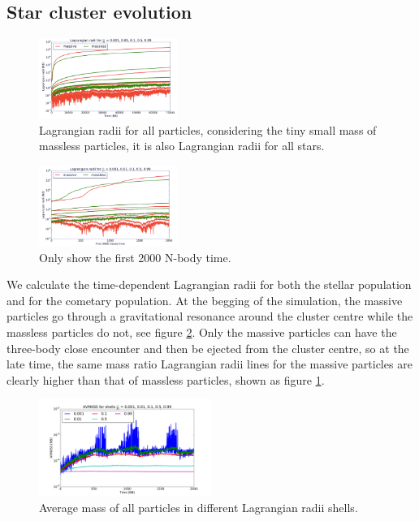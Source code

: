 \documentclass[usenatbib]{mnras}
\newcommand{\nna}{N_{\rm 1}}
\newcommand{\nnc}{N_{\rm 3}}
\begin{document}
\subsection{Star cluster evolution}

\begin{figure}
  \centering
  \includegraphics[width=0.4\textwidth,height=!]{lagrComparing.pdf}
  \caption{Lagrangian radii for all particles, considering the tiny small mass of massless particles, it is also Lagrangian radii for all stars.}
  \label{fig:lagrComparing}
\end{figure}


\begin{figure}
  \centering
  \includegraphics[width=0.4\textwidth,height=!]{lagr2000st.pdf}
  \caption{Only show the first 2000 N-body time.}
  \label{fig:lagr2000st}
\end{figure}

We calculate the time-dependent Lagrangian radii for both the stellar population and for the cometary population. At the begging of the simulation, the massive particles go through a gravitational resonance around the cluster centre while the massless particles do not, see figure \ref{fig:lagr2000st}.  Only the massive particles can have the three-body close encounter and then be ejected from the cluster centre, so at the late time, the same mass ratio Lagrangian radii lines for the massive particles are clearly higher than that of massless particles, shown as figure \ref{fig:lagrComparing}. 

\begin{figure}
  \centering
  \includegraphics[width=0.5\textwidth,height=!]{avmass.pdf}
  \caption{Average mass of all particles in different Lagrangian radii shells.}
  \label{fig:avmass}
\end{figure}
\end{document}
